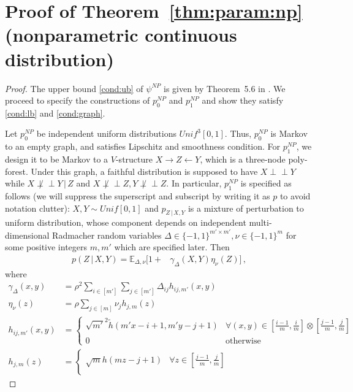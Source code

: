 \documentclass{article}
\theoremstyle{definition}
\theoremstyle{definition}
\theoremstyle{definition}
\theoremstyle{definition}
\theoremstyle{definition}
\theoremstyle{definition}
\theoremstyle{remark}
\theoremstyle{remark}
\newcommand{\E}{\mathbb{E}}
\newcommand{\given}{\,|\,}
\newcommand{\indep}{\perp \!\!\! \perp }
\begin{document}
\section{Proof of Theorem~\ref{thm:param:np} (nonparametric continuous distribution)}\label{app:np}


\begin{proof}
    The upper bound \ref{cond:ub} of $\psi^{NP}$ is given by Theorem~5.6 in \citet{neykov2021minimax}. We proceed to specify the constructions of $p_0^{NP}$ and $p_1^{NP}$ and show they satisfy \ref{cond:lb} and \ref{cond:graph}.

    Let $p_0^{NP}$ be independent uniform distributions $Unif^3[0,1]$. Thus, $p_0^{NP}$ is Markov to an empty graph, and satisfies Lipschitz and smoothness condition.
    For $p_1^{NP}$, we design it to be Markov to a $V$-structure $X\rightarrow Z \leftarrow Y$, which is a three-node poly-forest. Under this graph, a faithful distribution is supposed to have $X\indep Y$ while $X\not\indep Y\given Z$ and $X\not\indep Z,Y\not\indep Z$. In particular, $p_1^{NP}$ is specified as follows (we will suppress the superscript and subscript by writing it as $p$ to avoid notation clutter): $X,Y\sim Unif[0,1]$ and $p_{Z\given X,Y}$ is a mixture of perturbation to uniform distribution, whose component depends on independent multi-dimensional Radmacher random variables $\Delta \in\{-1,1\}^{m'\times m'},\nu\in\{-1,1\}^{m}$ for some positive integers $m,m'$ which are specified later. Then
    \begin{align*}
        p(Z\given X,Y) = \E_{\Delta,\nu}\bigg[1 + & \gamma_{\Delta}(X,Y)\eta_\nu(Z)  \bigg] \,,
    \end{align*}
    where
    \begin{align*}
        \gamma_{\Delta}(x,y) &= \rho^2 \sum_{i\in[m']}\sum_{j\in[m']}\Delta_{ij} h_{ij,m'}(x,y)\\
        \eta_{\nu}(z) &= \rho \sum_{j\in[m]}\nu_{j}  h_{j,m}(z) \\
        h_{ij,m'}(x,y) & = \begin{cases}
            \sqrt{m'}^2 \widetilde{h}(m'x-i+1, m'y-j+1) & \forall (x,y)\in [\frac{i-1}{m}, \frac{i}{m}] \otimes [\frac{j-1}{m}, \frac{j}{m}] \\
            0 &   \text{otherwise}
        \end{cases}  \\
        h_{j,m}(z) & = \begin{cases}
            \sqrt{m} h(m z - j + 1) & \forall z\in[\frac{j-1}{m}, \frac{j}{m}]\\

\end{cases}
\end{align*}
\end{proof}
\end{document}
